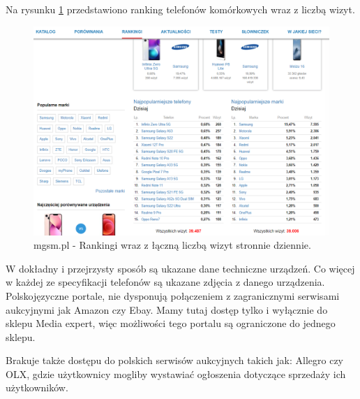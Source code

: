 Na rysunku \ref*{mgsm_2} przedstawiono ranking telefonów komórkowych wraz z liczbą wizyt.
\begin{figure}[H]
    \centering
    \includegraphics[scale=0.4]{img/mgsm/rankingsMgsm.png}
    \caption{mgsm.pl - Rankingi wraz z łączną liczbą wizyt stronnie dziennie.}
    \label{mgsm_2}
\end{figure}
W dokładny i przejrzysty sposób są ukazane dane techniczne urządzeń. Co więcej w każdej ze specyfikacji telefonów są ukazane zdjęcia z danego urządzenia. Polskojęzyczne portale, nie dysponują połączeniem z zagranicznymi serwisami aukcyjnymi jak Amazon czy Ebay. Mamy tutaj dostęp tylko i wyłącznie do sklepu Media expert, więc możliwości tego portalu są ograniczone do jednego sklepu.

Brakuje także dostępu do polskich serwisów aukcyjnych takich jak: Allegro czy OLX, gdzie użytkownicy mogliby wystawiać ogłoszenia dotyczące sprzedaży ich użytkowników.

